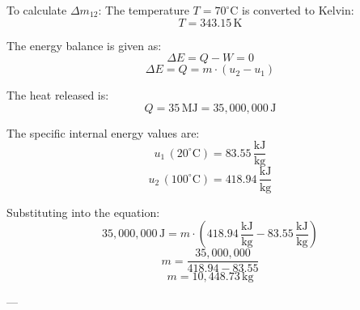 To calculate \( \Delta m_{12} \):  
The temperature \( T = 70^\circ\text{C} \) is converted to Kelvin:  
\[
T = 343.15 \, \text{K}
\]  

The energy balance is given as:  
\[
\Delta E = Q - W = 0
\]  
\[
\Delta E = Q = m \cdot (u_2 - u_1)
\]  

The heat released is:  
\[
Q = 35 \, \text{MJ} = 35,000,000 \, \text{J}
\]  

The specific internal energy values are:  
\[
u_1 \, (20^\circ\text{C}) = 83.55 \, \frac{\text{kJ}}{\text{kg}}
\]  
\[
u_2 \, (100^\circ\text{C}) = 418.94 \, \frac{\text{kJ}}{\text{kg}}
\]  

Substituting into the equation:  
\[
35,000,000 \, \text{J} = m \cdot \left(418.94 \, \frac{\text{kJ}}{\text{kg}} - 83.55 \, \frac{\text{kJ}}{\text{kg}}\right)
\]  
\[
m = \frac{35,000,000}{418.94 - 83.55}
\]  
\[
m = 10,448.73 \, \text{kg}
\]  

---
